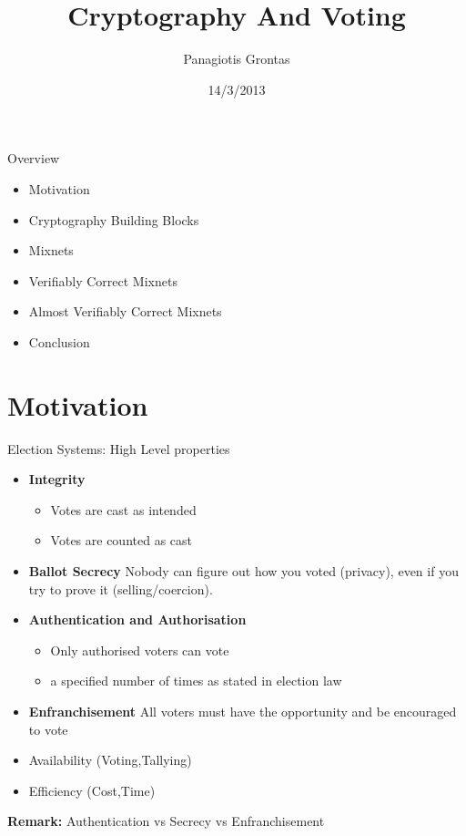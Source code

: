 \documentclass{beamer}
\title{Cryptography And Voting}
\author{Panagiotis Grontas}
\date{14/3/2013}
\institute{$\mu \Pi \lambda \forall$}
\newcommand*{\addsp}{\usebeamertemplate*{section page1}}
\begin{document}
\begin{frame}
\titlepage
\end{frame}

\begin{frame}{Overview}
\begin{itemize}
\item Motivation
\item Cryptography Building Blocks
\item Mixnets
\item Verifiably Correct Mixnets
\item Almost Verifiably Correct Mixnets
\item Conclusion
\end{itemize}
\end{frame}

\section{Motivation}

\begin{frame}
\addsp
\end{frame}

\begin{frame}{Election Systems: High Level properties}
\begin{itemize}
\item \textbf{Integrity}
\begin{itemize}
	\item Votes are cast as intended
	\item Votes are counted as cast
\end{itemize}
\item \textbf{Ballot Secrecy} Nobody can figure out how you voted (privacy), even if you try to prove it (selling/coercion).
\item \textbf{Authentication and Authorisation}
\begin{itemize}
	\item Only authorised voters can vote
	\item a specified number of times as stated in election law
\end{itemize}
\item \textbf{Enfranchisement} All voters must have the opportunity and be encouraged to vote
\item Availability (Voting,Tallying)
\item Efficiency (Cost,Time)
\end{itemize}
\textbf{Remark: } Authentication vs Secrecy vs Enfranchisement
\end{frame} 
\end{document}
